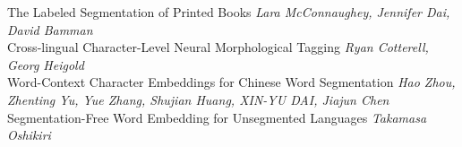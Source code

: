 \documentclass{book}
\begin{document}
    \noindent	The Labeled Segmentation of Printed Books \newline 
    {\itshape Lara McConnaughey, Jennifer Dai, David Bamman} \\
    
    \noindent	Cross-lingual Character-Level Neural Morphological Tagging \newline 
    {\itshape Ryan Cotterell, Georg Heigold} \\
    
    \noindent	Word-Context Character Embeddings for Chinese Word Segmentation \newline 
    {\itshape Hao Zhou, Zhenting Yu, Yue Zhang, Shujian Huang, XIN-YU DAI, Jiajun Chen} \\
    
    \noindent	Segmentation-Free Word Embedding for Unsegmented Languages \newline 
    {\itshape Takamasa Oshikiri} \\
    
\end{document}
